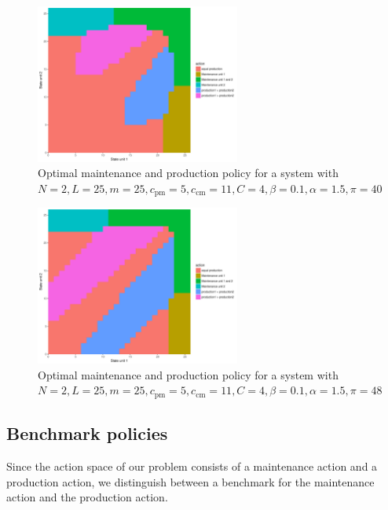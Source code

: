 \documentclass[a4paper,12pt]{article}
\begin{document}
\begin{figure}[H] \label{main-prod-policy3}
	\centering
	\includegraphics[width=0.6\textwidth]{figures/optimal_action_plot3}
	\caption{Optimal maintenance and production policy for a system with $N=2, L=25, m=25, c_\text{pm} = 5, c_\text{cm} = 11, C=4, \beta=0.1, \alpha=1.5, \pi=40$}
\end{figure}
\begin{figure}[H] \label{main-prod-policy4}
	\centering
	\includegraphics[width=0.6\textwidth]{figures/optimal_action_plot0}
	\caption{Optimal maintenance and production policy for a system with $N=2, L=25, m=25, c_\text{pm} = 5, c_\text{cm} = 11, C=4, \beta=0.1, \alpha=1.5, \pi=48$}
\end{figure}

\subsection{Benchmark policies}
Since the action space of our problem consists of a maintenance action and a production action, we distinguish between a benchmark for the maintenance action and the production action. 
\end{document}
